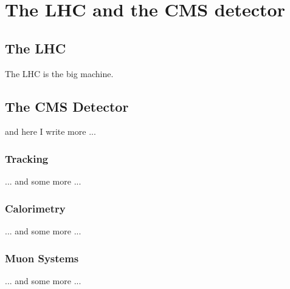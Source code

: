 \chapter{The LHC and the CMS detector}
\ifpdf
    \graphicspath{{03_Detector/plots/}}
\else
    \graphicspath{{03_Detector/plots/EPS/}{03_Detector/plots/}}
\fi

\section{The LHC}
The LHC is the big machine.

\section{The CMS Detector}
and here I write more ...

\subsection{Tracking}
... and some more ...

\subsection{Calorimetry}
... and some more ...

\subsection{Muon Systems}
... and some more ...


